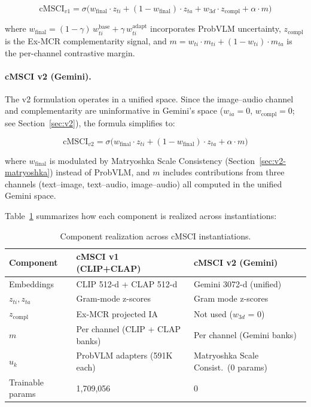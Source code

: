 \documentclass[a4paper,fleqn]{cas-sc}
\begin{document}
\begin{itemize}
\begin{equation}\label{eq:cmsci-v1}
\mathrm{cMSCI}_{v1} = \sigma\!\Big(w_{\mathrm{final}} \cdot z_{ti} + (1 - w_{\mathrm{final}}) \cdot z_{ta} + w_{3d} \cdot z_{\mathrm{compl}} + \alpha \cdot m\Big)
\end{equation}

where $w_{\mathrm{final}} = (1-\gamma)\,w_{ti}^{\mathrm{base}} + \gamma\,w_{ti}^{\mathrm{adapt}}$ incorporates ProbVLM uncertainty, $z_{\mathrm{compl}}$ is the Ex-MCR complementarity signal, and $m = w_{ti} \cdot m_{ti} + (1-w_{ti}) \cdot m_{ta}$ is the per-channel contrastive margin.

\paragraph{cMSCI v2 (Gemini).} The v2 formulation operates in a unified space. Since the image--audio channel and complementarity are uninformative in Gemini's space ($w_{ia} = 0$, $w_{\mathrm{compl}} = 0$; see Section~\ref{sec:v2}), the formula simplifies to:

\begin{equation}\label{eq:cmsci-v2}
\mathrm{cMSCI}_{v2} = \sigma\!\Big(w_{\mathrm{final}} \cdot z_{ti} + (1 - w_{\mathrm{final}}) \cdot z_{ta} + \alpha \cdot m\Big)
\end{equation}

where $w_{\mathrm{final}}$ is modulated by Matryoshka Scale Consistency (Section~\ref{sec:v2-matryoshka}) instead of ProbVLM, and $m$ includes contributions from three channels (text--image, text--audio, image--audio) all computed in the unified Gemini space.

Table~\ref{tab:component-comparison} summarizes how each component is realized across instantiations:

\begin{table}[t]
\caption{Component realization across cMSCI instantiations.}\label{tab:component-comparison}
\centering
\small
\begin{tabular}{lll}
\toprule
Component & cMSCI v1 (CLIP+CLAP) & cMSCI v2 (Gemini) \\
\midrule
Embeddings & CLIP 512-d + CLAP 512-d & Gemini 3072-d (unified) \\
$z_{ti}, z_{ta}$ & Gram-mode z-scores & Gram mode z-scores \\
$z_{\mathrm{compl}}$ & Ex-MCR projected IA & Not used ($w_{3d}$ = 0) \\
$m$ & Per channel (CLIP + CLAP banks) & Per channel (Gemini banks) \\
$u_k$ & ProbVLM adapters (591K each) & Matryoshka Scale Consist.\ (0 params) \\
Trainable params & 1,709,056 & 0 \\
\bottomrule
\end{tabular}
\end{table}


\end{itemize}
\end{document}
